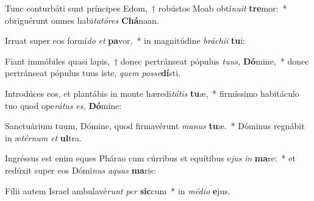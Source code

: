 \item Tunc conturbáti sunt príncipes Edom,~† robústos Moab obtí\textit{nuit} \textbf{tre}mor:~* obriguérunt omnes habi\textit{tatóres} \textbf{Chá}naan.
\item Irruat super eos formí\textit{do}\hspace{0.02em} \textit{et} \textbf{pa}vor,~* in magnitúdine \textit{bráchii} \textbf{tu}i:
\item Fiant immóbiles quasi lapis,~† donec pertránseat pópulus \textit{tuus,} \textbf{Dó}mine,~* donec pertránseat pópulus tuus iste, \textit{quem} \textit{posse}\textbf{dí}sti.
\item Introdúces eos, et plantábis in monte hæredi\textit{tátis} \textbf{tu}æ,~* firmíssimo habitáculo tuo quod ope\textit{rátus} \textit{es,} \textbf{Dó}mine:
\item Sanctuárium tuum, Dómine, quod firmavérunt \textit{manus} \textbf{tu}æ.~* Dóminus regnábit in æ\textit{térnum} \textit{et} \textbf{ul}tra.
\item Ingréssus est enim eques Phárao cum cúrribus et equítibus e\textit{jus} \textit{in} \textbf{ma}re:~* et redúxit super eos Dómi\textit{nus} \textit{aquas} \textbf{ma}ris:
\item Fílii autem Israel ambulavé\textit{runt} \textit{per} \textbf{sic}cum~* in \textit{médio} \textbf{e}jus.
